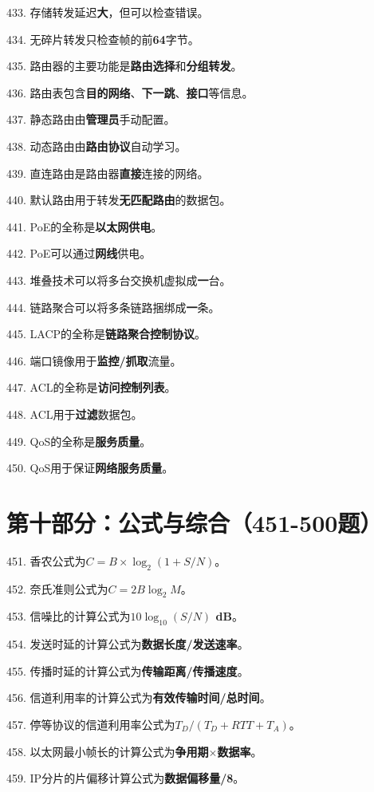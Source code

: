 \documentclass[12pt,a4paper,openany]{ctexbook}
\begin{document}
433. 存储转发延迟\textbf{大}，但可以检查错误。

434. 无碎片转发只检查帧的前\textbf{64}字节。

435. 路由器的主要功能是\textbf{路由选择}和\textbf{分组转发}。

436. 路由表包含\textbf{目的网络}、\textbf{下一跳}、\textbf{接口}等信息。

437. 静态路由由\textbf{管理员}手动配置。

438. 动态路由由\textbf{路由协议}自动学习。

439. 直连路由是路由器\textbf{直接}连接的网络。

440. 默认路由用于转发\textbf{无匹配路由}的数据包。

441. PoE的全称是\textbf{以太网供电}。

442. PoE可以通过\textbf{网线}供电。

443. 堆叠技术可以将多台交换机虚拟成\textbf{一}台。

444. 链路聚合可以将多条链路捆绑成\textbf{一}条。

445. LACP的全称是\textbf{链路聚合控制协议}。

446. 端口镜像用于\textbf{监控/抓取}流量。

447. ACL的全称是\textbf{访问控制列表}。

448. ACL用于\textbf{过滤}数据包。

449. QoS的全称是\textbf{服务质量}。

450. QoS用于保证\textbf{网络服务质量}。

\section{第十部分：公式与综合（451-500题）}

451. 香农公式为\textbf{$C=B\times\log_2(1+S/N)$}。

452. 奈氏准则公式为\textbf{$C=2B\log_2M$}。

453. 信噪比的计算公式为\textbf{$10\log_{10}(S/N)$ dB}。

454. 发送时延的计算公式为\textbf{数据长度/发送速率}。

455. 传播时延的计算公式为\textbf{传输距离/传播速度}。

456. 信道利用率的计算公式为\textbf{有效传输时间/总时间}。

457. 停等协议的信道利用率公式为\textbf{$T_D/(T_D+RTT+T_A)$}。

458. 以太网最小帧长的计算公式为\textbf{争用期$\times$数据率}。

459. IP分片的片偏移计算公式为\textbf{数据偏移量/8}。
\end{document}

